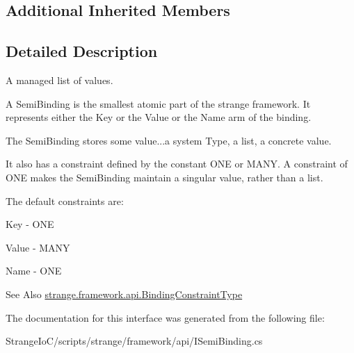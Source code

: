 \subsection*{Additional Inherited Members}


\subsection{Detailed Description}
A managed list of values. 

A Semi\-Binding is the smallest atomic part of the strange framework. It represents either the Key or the Value or the Name arm of the binding. \par
 The Semi\-Binding stores some value...a system Type, a list, a concrete value. \par
 It also has a constraint defined by the constant O\-N\-E or M\-A\-N\-Y. A constraint of O\-N\-E makes the Semi\-Binding maintain a singular value, rather than a list. \par
 The default constraints are\-: 
\begin{DoxyItemize}
\item Key -\/ O\-N\-E 
\item Value -\/ M\-A\-N\-Y 
\item Name -\/ O\-N\-E 
\end{DoxyItemize}

\begin{DoxySeeAlso}{See Also}
\hyperlink{namespacestrange_1_1framework_1_1api_a9819c5ab6d03a2cbce2d3dddf5264e42}{strange.\-framework.\-api.\-Binding\-Constraint\-Type} 
\end{DoxySeeAlso}


The documentation for this interface was generated from the following file\-:\begin{DoxyCompactItemize}
\item 
Strange\-Io\-C/scripts/strange/framework/api/I\-Semi\-Binding.\-cs\end{DoxyCompactItemize}

